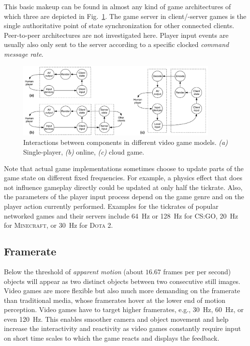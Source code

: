This basic makeup can be found in almost any kind of game architectures of which three are depicted in Fig.~\ref{fig:component-models}. The game server in client/-server games is the single authoritative point of state synchronization for other connected clients. Peer-to-peer architectures are not investigated here. Player input events are usually also only sent to the server according to a specific clocked \textit{command message rate}.

\begin{figure}[!t]
  \centering
  \includegraphics[width=0.9\textwidth]{../../../models/component_interaction_full.pdf}
  \caption{Interactions between components in different video game models. \textit{(a)} Single-player, \textit{(b)} online, \textit{(c)} cloud game.}
  \label{fig:component-models}
\end{figure}

Note that actual game implementations sometimes choose to update parts of the game state on different fixed frequencies. For example, a physics effect that does not influence gameplay directly could be updated at only half the tickrate. Also, the parameters of the player input process depend on the game genre and on the player action currently performed. Examples for the tickrates of popular networked games and their servers include \SI{64}{\hertz} or \SI{128}{\hertz} for \textsc{CS:GO}, \SI{20}{\hertz} for \textsc{Minecraft}, or \SI{30}{\hertz} for \textsc{Dota 2}.


\subsection{Framerate}
\label{sec:framerate}


Below the threshold of \textit{apparent motion} (about $16.67$ frames per per second) objects will appear as two distinct objects between two consecutive still images. Video games are more flexible but also much more demanding on the framerate than traditional media, whose framerates hover at the lower end of motion perception. Video games have to target higher framerates, e.g., \SI{30}{\hertz}, \SI{60}{\hertz}, or even \SI{120}{\hertz}. This enables smoother camera and object movement and help increase the interactivity and reactivity as video games constantly require input on short time scales to which the game reacts and displays the feedback.



